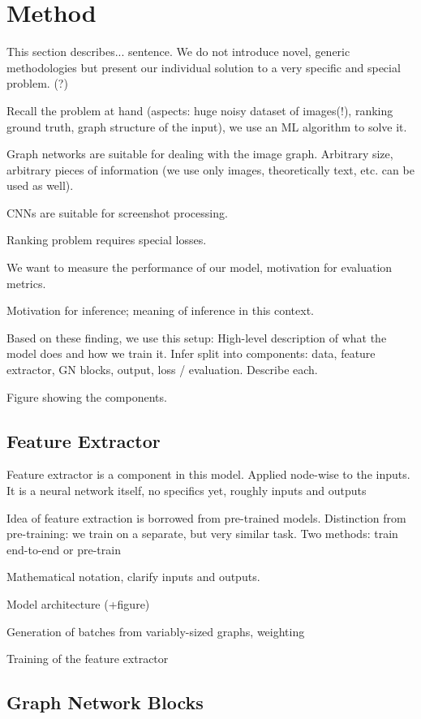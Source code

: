 \section{Method}

This section describes... sentence. We do not introduce novel, generic methodologies but present our individual solution to a very specific and special problem. (?)

Recall the problem at hand (aspects: huge noisy dataset of images(!), ranking ground truth, graph structure of the input), we use an ML algorithm to solve it.

Graph networks are suitable for dealing with the image graph. Arbitrary size, arbitrary pieces of information (we use only images, theoretically text, etc. can be used as well).

CNNs are suitable for screenshot processing.

Ranking problem requires special losses.

We want to measure the performance of our model, motivation for evaluation metrics.

Motivation for inference; meaning of inference in this context.

Based on these finding, we use this setup: High-level description of what the model does and how we train it. Infer split into components: data, feature extractor, GN blocks, output, loss / evaluation. Describe each.

Figure showing the components.

\subsection{Feature Extractor}

Feature extractor is a component in this model. Applied node-wise to the inputs. It is a neural network itself, no specifics yet, roughly inputs and outputs

Idea of feature extraction is borrowed from pre-trained models. Distinction from pre-training: we train on a separate, but very similar task. Two methods: train end-to-end or pre-train

Mathematical notation, clarify inputs and outputs.

Model architecture (+figure)

Generation of batches from variably-sized graphs, weighting

Training of the feature extractor

\subsection{Graph Network Blocks}


